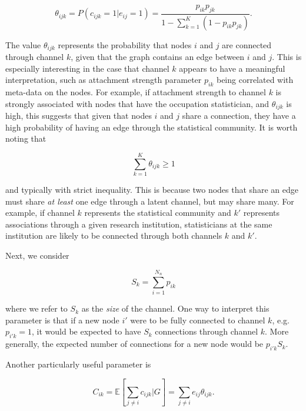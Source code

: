 \documentclass[11pt]{amsart}
\newcommand{\latcon}[3]{c_{#1#2#3} }
\newcommand{\hubProb}{\theta}
\newcommand{\expCon}{C}
\begin{document}
\begin{equation} \label{eq:condProb}
\hubProb_{ijk} = P( \latcon{i}{j}{k} = 1 | e_{ij} = 1) = \frac{p_{ik} p_{jk} } { 1 - \sum_{k = 1}^K (1 - p_{ik} p_{jk}) }.
\end{equation}

The value $\hubProb_{ijk}$ represents the probability that nodes $i$ and $j$ are connected through channel $k$, 
given that the graph contains an edge between $i$ and $j$. This is especially interesting in the case that 
channel $k$ appears to have a meaningful interpretation, such as attachment strength parameter $p_{ik}$ being correlated with meta-data
on the nodes. For example, if attachment strength to channel $k$ is strongly associated with nodes that have the occupation statistician, and 
$\hubProb_{ijk}$ is high, this suggests that given that nodes $i$ and $j$ share a connection, they have a high probability 
of having an edge through the statistical community. 
It is worth noting that 


\begin{equation}\label{eq:condProbIneq}
\sum_{k = 1}^K \hubProb_{ijk} \geq 1
\end{equation}

and typically with strict inequality. This is because two nodes that share an edge must share \emph{at least} 
one edge through a latent channel, but may share many. For example, if channel $k$ represents the statistical community 
and $k'$ represents associations through a given research institution, 
statisticians at the same institution are likely to be connected through both channels $k$ and $k'$. 

Next, we consider 

\begin{equation}\label{eq:hubsize}
S_k = \sum_{i = 1}^{N_n} p_{ik}
\end{equation}

where we refer to $S_k$ as the \emph{size} of the channel. 
One way to interpret this parameter is that if a new node $i'$ were to 
be fully connected to channel $k$, e.g. $p_{i' k} = 1$, it would be expected to have 
$S_k$ connections through channel $k$. More generally, the  expected number of connections
for a new node would be $p_{i' k} S_k$. 

Another particularly useful parameter is 

\begin{equation}\label{eq:expConnects}
\expCon_{ik} = \mathbb{E}\left[ \scriptstyle \sum_{j \neq i} \latcon{i}{j}{k} | G \right] = \displaystyle \sum_{j \neq i} e_{ij} \hubProb_{ijk}.
\end{equation}
\end{document}
